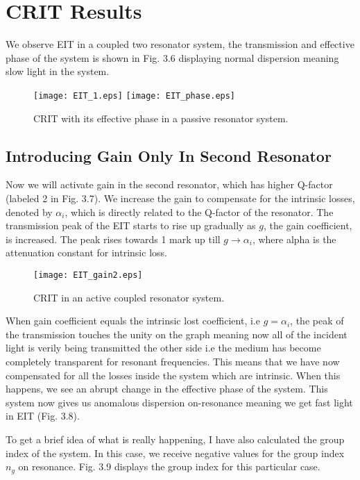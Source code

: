 \section{CRIT Results}
We observe EIT in a coupled two resonator system, the transmission and effective phase of the system is shown in Fig. 3.6 displaying normal dispersion meaning slow light in the system.

\begin{figure}[h]
\texttt{[image: EIT\_1.eps]}
\texttt{[image: EIT\_phase.eps]}
\caption{CRIT with its effective phase in a passive resonator system.}
\end{figure}

\subsection{Introducing Gain Only In Second Resonator}
Now we will activate gain in the second resonator, which has higher Q-factor (labeled 2 in Fig. 3.7). We increase the gain to compensate for the intrinsic losses, denoted by $\alpha_{i}$, which is directly related to the Q-factor of the resonator. The transmission peak of the EIT starts to rise up gradually as $g$, the gain coefficient, is increased. The peak rises towards 1 mark up till $g \to \alpha_{i}$, where alpha is the attenuation constant for intrinsic loss. 

\begin{figure}[h]
\centering
\texttt{[image: EIT\_gain2.eps]}
\caption{CRIT in an active coupled resonator system.}
\end{figure}

When gain coefficient equals the intrinsic lost coefficient, i.e $g = \alpha_{i}$, the peak of the transmission touches the unity on the graph meaning now all of the incident light is verily being transmitted the other side i.e the medium has become completely transparent for resonant frequencies. This means that we have now compensated for all the losses inside the system which are intrinsic. When this happens, we see an abrupt change in the effective phase of the system. This system now gives us anomalous dispersion on-resonance meaning we get fast light in EIT (Fig. 3.8). 

To get a brief idea of what is really happening, I have also calculated the group index of the system. In this case, we receive negative values for the group index $n_{g}$ on resonance. Fig. 3.9 displays the group index for this particular case.


